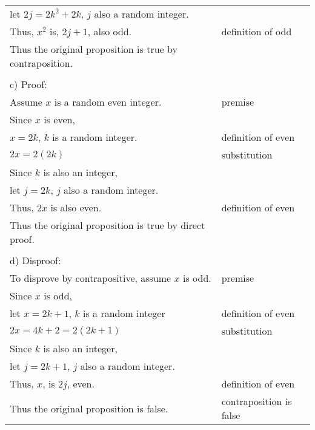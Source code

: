 \documentclass[12pt]{exam}
\begin{document}
\begin{solution}
\begin{tabular}{ll}
		let $2j=2k^2+2k$, $j$ also a random integer.                                              \\
		Thus, $x^2$ is, $2j+1$, also odd.                               & definition of odd       \\
		Thus the original proposition is true by contraposition.                                  \\
		\\
		c) Proof:                                                                                 \\
		Assume $x$ is a random even integer.                            & premise                 \\
		Since $x$ is even,                                                                        \\
		$x=2k$, $k$ is a random integer.                                & definition of even      \\
		$2x=2(2k)$                                                      & substitution            \\
		Since $k$ is also an integer,                                                             \\
		let $j=2k$, $j$ also a random integer.                                                    \\
		Thus, $2x$ is also even.                                        & definition of even      \\
		Thus the original proposition is true by direct proof.                                    \\
		\\
		d) Disproof:                                                                              \\
		To disprove by contrapositive, assume $x$ is odd.               & premise                 \\
		Since $x$ is odd,                                                                         \\
		let $x=2k+1$, $k$ is a random integer                           & definition of even      \\
		$2x=4k+2=2(2k+1)$                                               & substitution            \\
		Since $k$ is also an integer,                                                             \\
		let $j=2k+1$, $j$ also a random integer.                                                  \\
		Thus, $x$, is $2j$, even.                                       & definition of even      \\
		Thus the original proposition is false.                         & contraposition is false \\
	\end{tabular}
\end{solution}
\end{document}
